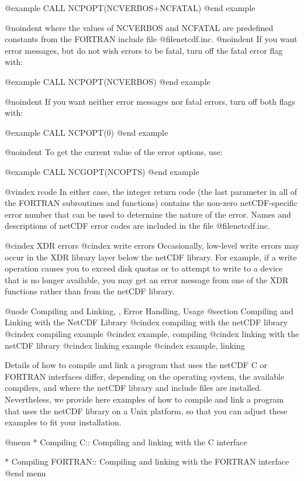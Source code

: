 @example
      CALL NCPOPT(NCVERBOS+NCFATAL)
@end example

@noindent
where the values of NCVERBOS and NCFATAL are predefined constants from
the FORTRAN include file @file{netcdf.inc}.
@noindent
If you want error messages, but do not wish errors to be fatal, turn
off the fatal error flag with:

@example
      CALL NCPOPT(NCVERBOS)
@end example

@noindent
If you want neither error messages nor fatal errors, turn off both flags
with:

@example
      CALL NCPOPT(0)
@end example

@noindent
To get the current value of the error options, use:

@example
      CALL NCGOPT(NCOPTS)
@end example

@vindex rcode
In either case, the integer return code (the last parameter in all of the
FORTRAN subroutines and functions) contains the non-zero netCDF-specific
error number that can be used to determine the nature of the error.  Names
and descriptions of netCDF error codes are included in the file
@file{netcdf.inc}.

@cindex XDR errors
@cindex write errors
Occasionally, low-level write errors may occur in the XDR library layer
below the netCDF library.  For example, if a write operation causes you
to exceed disk quotas or to attempt to write to a device that is no
longer available, you may get an error message from one of the XDR
functions rather than from the netCDF library.

@node Compiling and Linking,  , Error Handling, Usage
@section Compiling and Linking with the NetCDF Library
@cindex compiling with the netCDF library
@cindex compiling example
@cindex example, compiling
@cindex linking with the netCDF library
@cindex linking example
@cindex example, linking

Details of how to compile and link a program that uses the netCDF C or
FORTRAN interfaces differ, depending on the operating system, the
available compilers, and where the netCDF library and include files are
installed.  Nevertheless, we provide here examples of how to compile and
link a program that uses the netCDF library on a Unix platform, so that
you can adjust these examples to fit your installation.

@menu
* Compiling C::                 Compiling and linking with the C interface

* Compiling FORTRAN::           Compiling and linking with the FORTRAN interface
@end menu

